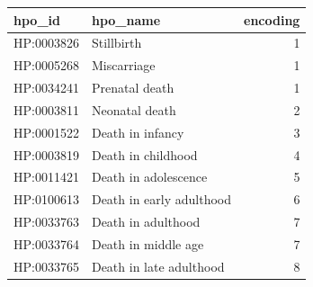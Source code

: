 \documentclass[
]{report}
\begin{document}
\newpage{}

\begin{longtable}[]{@{}llr@{}}
\toprule\noalign{}
hpo\_id & hpo\_name & encoding \\
\midrule\noalign{}
\endhead
\bottomrule\noalign{}
\endlastfoot
HP:0003826 & Stillbirth & 1 \\
HP:0005268 & Miscarriage & 1 \\
HP:0034241 & Prenatal death & 1 \\
HP:0003811 & Neonatal death & 2 \\
HP:0001522 & Death in infancy & 3 \\
HP:0003819 & Death in childhood & 4 \\
HP:0011421 & Death in adolescence & 5 \\
HP:0100613 & Death in early adulthood & 6 \\
HP:0033763 & Death in adulthood & 7 \\
HP:0033764 & Death in middle age & 7 \\
HP:0033765 & Death in late adulthood & 8 \\
\end{longtable}
\end{document}
